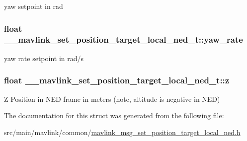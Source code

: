 yaw setpoint in rad 

\hypertarget{struct____mavlink__set__position__target__local__ned__t_a45f79f5934d23e81cb7a3012e6d43bdd}{
\subsubsection[{yaw\+\_\+rate}]{\setlength{\rightskip}{0pt plus 5cm}float \+\_\+\+\_\+mavlink\+\_\+set\+\_\+position\+\_\+target\+\_\+local\+\_\+ned\+\_\+t\+::yaw\+\_\+rate}}\label{struct____mavlink__set__position__target__local__ned__t_a45f79f5934d23e81cb7a3012e6d43bdd}


yaw rate setpoint in rad/s 

\hypertarget{struct____mavlink__set__position__target__local__ned__t_a276f6a7fdc80c385541069f66beb267f}{
\subsubsection[{z}]{\setlength{\rightskip}{0pt plus 5cm}float \+\_\+\+\_\+mavlink\+\_\+set\+\_\+position\+\_\+target\+\_\+local\+\_\+ned\+\_\+t\+::z}}\label{struct____mavlink__set__position__target__local__ned__t_a276f6a7fdc80c385541069f66beb267f}


Z Position in N\+E\+D frame in meters (note, altitude is negative in N\+E\+D) 



The documentation for this struct was generated from the following file\+:\begin{DoxyCompactItemize}
\item 
src/main/mavlink/common/\hyperlink{mavlink__msg__set__position__target__local__ned_8h}{mavlink\+\_\+msg\+\_\+set\+\_\+position\+\_\+target\+\_\+local\+\_\+ned.\+h}\end{DoxyCompactItemize}
